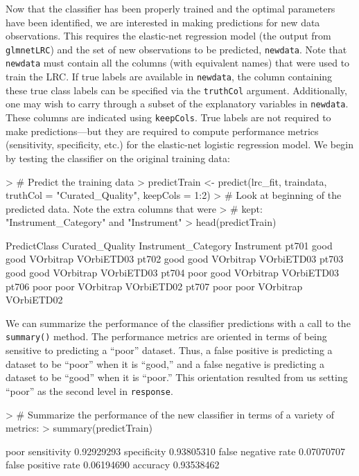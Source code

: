\documentclass{article}
\begin{document}
Now that the classifier has been properly trained and the optimal parameters have been identified, we are 
interested in making predictions for new data observations. This requires the elastic-net regression model 
(the output from {\tt glmnetLRC}) and the set of new observations to be predicted, {\tt newdata}.  
Note that {\tt newdata} must contain all the columns (with equivalent names) that were used to train the LRC.
If true labels are available in {\tt newdata}, the column containing 
these true class labels can be specified via the 
{\tt truthCol} argument. Additionally, one may wish to carry through a subset of the explanatory variables in 
{\tt newdata}.  These columns are indicated using {\tt keepCols}.   True labels are not required to make 
predictions---but they are required to compute performance metrics (sensitivity, specificity, etc.) for the 
elastic-net logistic regression model. We begin by testing the classifier on the original training data:
\begin{Schunk}
\begin{Sinput}
> # Predict the training data
> predictTrain <- predict(lrc_fit, traindata, truthCol = "Curated_Quality", keepCols = 1:2)
> # Look at beginning of the predicted data.  Note the extra columns that were 
> # kept:  "Instrument_Category" and "Instrument"
> head(predictTrain)
\end{Sinput}
\begin{Soutput}
      PredictClass Curated_Quality Instrument_Category Instrument
pt701         good            good           VOrbitrap VOrbiETD03
pt702         good            good           VOrbitrap VOrbiETD03
pt703         good            good           VOrbitrap VOrbiETD03
pt704         poor            good           VOrbitrap VOrbiETD03
pt706         poor            poor           VOrbitrap VOrbiETD02
pt707         poor            poor           VOrbitrap VOrbiETD02
\end{Soutput}
\end{Schunk}
\noindent We can summarize the performance of the classifier predictions with a call to the {\tt summary()} method.
The performance metrics are oriented in terms of being sensitive to predicting a ``poor'' dataset.  Thus, a 
false positive is predicting a dataset to be ``poor'' when it is ``good,'' and a false negative is predicting a 
dataset to be ``good'' when it is ``poor.''  This orientation resulted from us setting ``poor'' as the second
level in {\tt response}.
\begin{Schunk}
\begin{Sinput}
> # Summarize the performance of the new classifier in terms of a variety of metrics:
> summary(predictTrain)
\end{Sinput}
\begin{Soutput}
                          poor
sensitivity         0.92929293
specificity         0.93805310
false negative rate 0.07070707
false positive rate 0.06194690
accuracy            0.93538462
\end{Soutput}
\end{Schunk}
\end{document}
